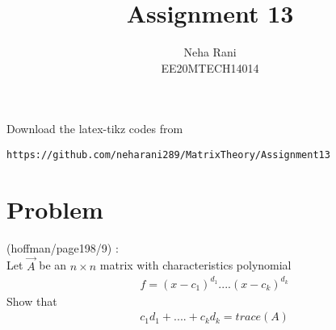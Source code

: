 \documentclass[journal,12pt]{IEEEtran}
\begin{document}
     \def\rightbox#1{\makebox[0in][r]{#1}}
     \def\centbox#1{\makebox[0in]{#1}}
     \def\topbox#1{\raisebox{-\baselineskip}[0in][0in]{#1}}
     \def\midbox#1{\raisebox{-0.5\baselineskip}[0in][0in]{#1}}
\vspace{3cm}
\title{Assignment 13}
\author{Neha Rani\\EE20MTECH14014}
\maketitle
\bigskip
\renewcommand{\thefigure}{\theenumi}
\renewcommand{\thetable}{\theenumi}
%
Download the latex-tikz codes from 
%
\begin{lstlisting}
https://github.com/neharani289/MatrixTheory/Assignment13
\end{lstlisting}
\bigskip
\section{\textbf{Problem}}
(hoffman/page198/9) : \\
%
Let $\vec{A}$ be an $n\times n$ matrix with characteristics polynomial\\
\begin{align}
& f = (x-c_1)^{d_1}....(x-c_k)^{d_k} \nonumber
\end{align}
Show that
\begin{align}
& c_1d_1+....+c_kd_k = trace(A)\nonumber
\end{align}
%
%
%
\bigskip\\
\end{document}

